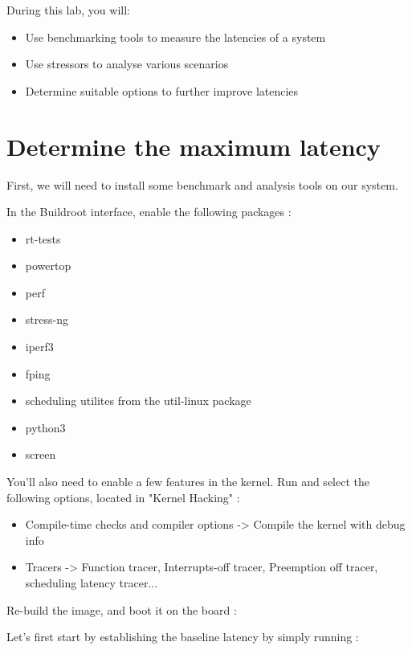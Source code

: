 
During this lab, you will:
\begin{itemize}
  \item Use benchmarking tools to measure the latencies of a system
  \item Use stressors to analyse various scenarios
  \item Determine suitable options to further improve latencies
\end{itemize}

\section{Determine the maximum latency}

First, we will need to install some benchmark and analysis tools on our system.

In the Buildroot  interface, enable the following packages :

\begin{itemize}
	\item rt-tests
	\item powertop
	\item perf
	\item stress-ng
	\item iperf3
	\item fping
	\item scheduling utilites from the util-linux package
	\item python3
	\item screen
\end{itemize}

You'll also need to enable a few features in the kernel. Run  and select
the following options, located in "Kernel Hacking" :

\begin{itemize}
	\item Compile-time checks and compiler options -> Compile the kernel with debug info
	\item Tracers -> Function tracer, Interrupts-off tracer, Preemption off tracer, scheduling latency tracer...
\end{itemize}

Re-build the image, and boot it on the board : 

Let's first start by establishing the baseline latency by simply running  :


